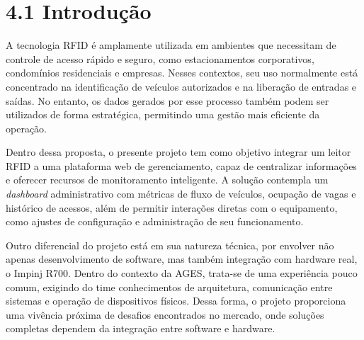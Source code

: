 \hypertarget{__RefHeading___Toc4799_3118176633}{}
\section*{4.1 Introdução}
\label{ages-iii:text-h-0075}

\originaltab{}A tecnologia RFID é amplamente utilizada em ambientes que necessitam de controle de acesso rápido e seguro, como estacionamentos corporativos\space\cite{ages-iii-rfid-parking-use-cases}, condomínios residenciais e empresas. Nesses contextos, seu uso normalmente está concentrado na identificação de veículos autorizados e na liberação de entradas e saídas. No entanto, os dados gerados por esse processo também podem ser utilizados de forma estratégica, permitindo uma gestão mais eficiente da operação.\par

Dentro dessa proposta, o presente projeto tem como objetivo integrar um leitor RFID a uma plataforma web de gerenciamento, capaz de centralizar informações e oferecer recursos de monitoramento inteligente. A solução contempla um \textit{dashboard} administrativo com métricas de fluxo de veículos, ocupação de vagas e histórico de acessos, além de permitir interações diretas com o equipamento, como ajustes de configuração e administração de seu funcionamento.\par

Outro diferencial do projeto está em sua natureza técnica, por envolver não apenas desenvolvimento de software, mas também integração com hardware real, o Impinj R700\space\cite{ages-iii-impinj-r700}. Dentro do contexto da AGES, trata-se de uma experiência pouco comum, exigindo do time conhecimentos de arquitetura, comunicação entre sistemas e operação de dispositivos físicos. Dessa forma, o projeto proporciona uma vivência próxima de desafios encontrados no mercado, onde soluções completas dependem da integração entre software e hardware.\par

